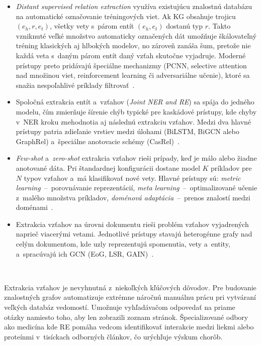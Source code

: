 \begin{itemize}
  \item \textit{Distant supervised relation extraction} využíva existujúcu znalostnú databázu na automatické označovanie tréningových viet. Ak KG obsahuje trojicu $(e_h, r, e_t)$, všetky vety s~párom entít $(e_h, e_t)$ dostanú typ $r$. Takto vzniknuté veľké množstvo automaticky označených dát umožňuje škálovateľný tréning klasických aj hlbokých modelov, no zároveň zanáša šum, pretože nie každá veta s~daným párom entít daný vzťah skutočne vyjadruje. Moderné prístupy preto pridávajú špeciálne mechanizmy (PCNN, selective attention nad množinou viet, reinforcement learning či adversariálne učenie), ktoré sa snažia nespoľahlivé príklady filtrovať~\cite{autKGconstruction2023}.
  \item Spoločná extrakcia entít a~vzťahov (\textit{Joint NER and RE}) sa spája do jedného modelu, čím zmierňuje šírenie chýb typické pre kaskádové prístupy, kde chyby v~NER kroku znehodnotia aj následnú extrakciu vzťahov. Medzi dva hlavné prístupy patria zdieľanie vrstiev medzi úlohami (BiLSTM, BiGCN alebo GraphRel) a~špeciálne anotovacie schémy (CasRel)~\cite{autKGconstruction2023}.
  \item \textit{Few-shot} a~\textit{zero-shot} extrakcia vzťahov rieši prípady, keď je málo alebo žiadne anotované dáta. Pri štandardnej konfigurácii dostane model $K$ príkladov pre $N$ typov vzťahov a~má klasifikovať nové vety. Hlavné prístupy sú: \textit{metric learning}~--~porovnávanie reprezentácií, \textit{meta learning}~--~optimalizované učenie z~malého množstva príkladov, \textit{doménová adaptácia}~--~prenos znalostí medzi doménami~\cite{autKGconstruction2023}.
  \item Extrakcia vzťahov na úrovni dokumentu rieši problém vzťahov vyjadrených naprieč viacerými vetami. Jednotlivé prístupy stavajú heterogénne grafy nad celým dokumentom, kde uzly reprezentujú spomenutia, vety a~entity, a~spracúvajú ich GCN (EoG, LSR, GAIN)~\cite{autKGconstruction2023}.
\end{itemize}

\

Extrakcia vzťahov je nevyhnutná z~niekoľkých kľúčových dôvodov. Pre budovanie znalostných grafov automatizuje extrémne náročnú manuálnu prácu pri vytváraní veľkých databáz vedomostí. Umožnuje vyhľadávačom odpovedať na priame otázky namiesto toho, aby len zobrazili zoznam stránok. Špecializované odbory ako medicína kde RE pomáha vedcom identifikovať interakcie medzi liekmi alebo proteínmi v~tisíckach odborných článkov, čo urýchľuje výskum chorôb.~\cite{autKGconstruction2023,moncecchiRE2010}




